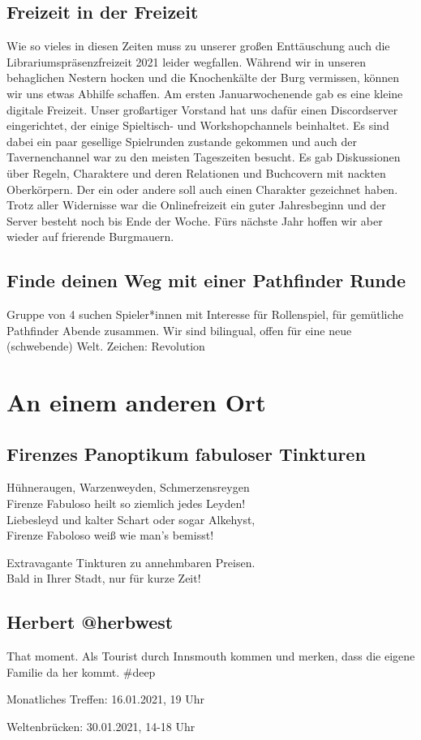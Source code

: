 \documentclass[final]{multiversum}
\begin{document}
\subsection{Freizeit in der Freizeit}
Wie so vieles in diesen Zeiten muss zu unserer großen Enttäuschung auch die Librariumspräsenzfreizeit 2021 leider wegfallen.
Während wir in unseren behaglichen Nestern hocken und die Knochenkälte der Burg vermissen, können wir uns etwas Abhilfe schaffen.
Am ersten Januarwochenende gab es eine kleine digitale Freizeit.
Unser großartiger Vorstand hat uns dafür einen Discordserver eingerichtet, der einige Spieltisch- und Workshopchannels beinhaltet.
Es sind dabei ein paar gesellige Spielrunden zustande gekommen und auch der Tavernenchannel war zu den meisten Tageszeiten besucht.
Es gab Diskussionen über Regeln, Charaktere und deren Relationen und Buchcovern mit nackten Oberkörpern.
Der ein oder andere soll auch einen Charakter gezeichnet haben.
Trotz aller Widernisse war die Onlinefreizeit ein guter Jahresbeginn und der Server besteht noch bis Ende der Woche.
Fürs nächste Jahr hoffen wir aber wieder auf frierende Burgmauern.

\subsection{Finde deinen Weg mit einer Pathfinder Runde}
Gruppe von 4 suchen Spieler*innen mit Interesse für Rollenspiel, für gemütliche Pathfinder Abende zusammen.
Wir sind bilingual, offen für eine neue (schwebende) Welt.
Zeichen: Revolution

\section{An einem anderen Ort}

\subsection{Firenzes Panoptikum fabuloser Tinkturen}
Hühneraugen, Warzenweyden, Schmerzensreygen\\
Firenze Fabuloso heilt so ziemlich jedes Leyden!\\
Liebesleyd und kalter Schart oder sogar Alkehyst,\\
Firenze Faboloso weiß wie man's bemisst!

Extravagante Tinkturen zu annehmbaren Preisen.\\
Bald in Ihrer Stadt, nur für kurze Zeit! 

\subsection{Herbert @herbwest}
That moment. Als Tourist durch Innsmouth kommen und merken, dass die eigene Familie da her kommt. \#deep

\begin{termine}
\item Monatliches Treffen: 16.01.2021, 19 Uhr
\item Weltenbrücken: 30.01.2021, 14-18 Uhr
\end{termine}
\impressum
\end{document}
